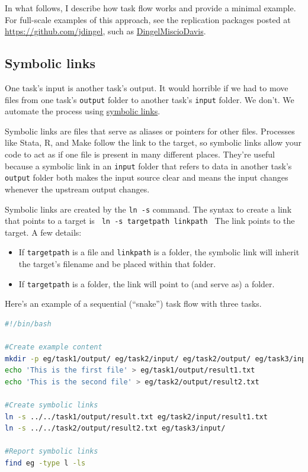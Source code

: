 In what follows, I describe how task flow works and provide a minimal example.
For full-scale examples of this approach, see the replication packages posted at \url{https://github.com/jdingel},
such as \href{https://github.com/jdingel/DingelMiscioDavis}{DingelMiscioDavis}.

\subsection{Symbolic links}

One task's input is another task's output.
It would horrible if we had to move files from one task's \texttt{output} folder to another task's \texttt{input} folder.
We don't.
We automate the process using \href{https://en.wikipedia.org/wiki/Symbolic_link\#POSIX_and_Unix-like_operating_systems}{symbolic links}.

Symbolic links are files that serve as aliases or pointers for other files.
Processes like Stata, R, and Make follow the link to the target,
so symbolic links allow your code to act as if one file is present in many different places.
They're useful because a symbolic link in an \texttt{input} folder that refers to data in another task's \texttt{output} folder 
both makes the input source clear and means the input changes whenever the upstream output changes.

Symbolic links are created by the \texttt{ln -s} command.
The syntax to create a link that points to a target is
\texttt{
ln -s targetpath linkpath
}
The link points to the target. A few details:
\begin{itemize}
	\item If \texttt{targetpath} is a file and \texttt{linkpath} is a folder, the symbolic link will inherit the target's filename and be placed within that folder.
	\item If \texttt{targetpath} is a folder, the link will point to (and serve as) a folder.
\end{itemize}

Here's an example of a sequential (``snake'') task flow with three tasks.
\begin{lstlisting}[language=bash]
#!/bin/bash

#Create example content
mkdir -p eg/task1/output/ eg/task2/input/ eg/task2/output/ eg/task3/input/
echo 'This is the first file' > eg/task1/output/result1.txt
echo 'This is the second file' > eg/task2/output/result2.txt

#Create symbolic links
ln -s ../../task1/output/result.txt eg/task2/input/result1.txt
ln -s ../../task2/output/result2.txt eg/task3/input/

#Report symbolic links
find eg -type l -ls
\end{lstlisting}


